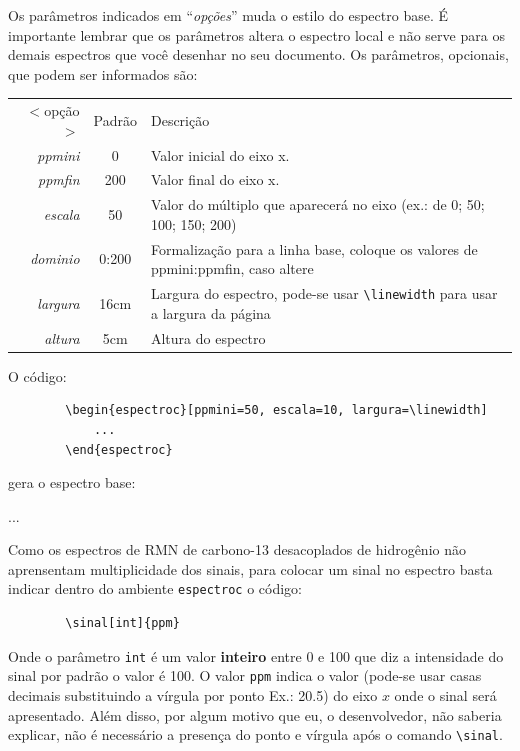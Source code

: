 \documentclass[a4paper, 11pt]{article}
\begin{document}
	\begin{espectroc}
	\end{espectroc}
	
	Os parâmetros indicados em ``{\it opções}'' muda o estilo do espectro base. É importante lembrar que os parâmetros altera o espectro local e não serve para os demais espectros que você desenhar no seu documento. Os parâmetros, opcionais, que podem ser informados são:
	
	\begin{table}[h]
		\begin{tabular}{r c l}
			$<$opção$>$ & Padrão & Descrição\\
			\textit{ppmini}	& 0		& Valor inicial do eixo x.\\
			\textit{ppmfin}	& 200	& Valor final do eixo x.\\
			\textit{escala}	& 50	& Valor do múltiplo que aparecerá no eixo (ex.: de 0; 50; 100; 150; 200)\\
			\textit{dominio}	& 0:200	& Formalização para a linha base, coloque os valores de ppmini:ppmfin, caso altere\\
			\textit{largura} & 16cm	& Largura do espectro, pode-se usar \verb|\linewidth| para usar a largura da página\\
			\textit{altura}	& 5cm	& Altura do espectro
		\end{tabular}
	\end{table}
	
	O código:
	\begin{verbatim}
		\begin{espectroc}[ppmini=50, escala=10, largura=\linewidth]
			...
		\end{espectroc}
	\end{verbatim}
	gera o espectro base:
	
	\begin{espectroc}[ppmini=50,
					  escala=10, 
					  largura=\linewidth]
		...
	\end{espectroc}
	
	Como os espectros de RMN de carbono-13 desacoplados de hidrogênio não aprensentam multiplicidade dos sinais, para colocar um sinal no espectro basta indicar dentro do ambiente \verb|espectroc| o código:
	\begin{verbatim}
		\sinal[int]{ppm}
	\end{verbatim}
	Onde o parâmetro \verb|int| é um valor {\bf inteiro} entre 0 e 100 que diz a intensidade do sinal por padrão o valor é 100. O valor \verb|ppm| indica o valor (pode-se usar casas decimais substituindo a vírgula por ponto Ex.: 20.5) do eixo $x$ onde o sinal será apresentado. Além disso, por algum motivo que eu, o desenvolvedor, não saberia explicar, não é necessário a presença do ponto e vírgula após o comando \verb|\sinal|.
	
\end{document}
